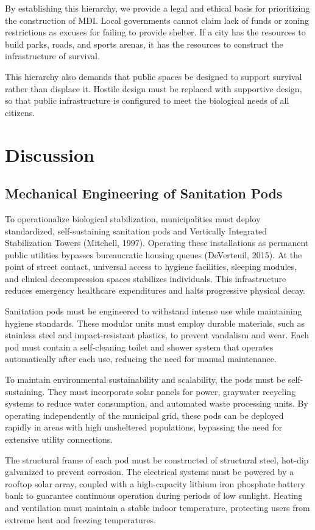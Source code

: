 \documentclass[12pt]{article}
\begin{document}
By establishing this hierarchy, we provide a legal and ethical basis for prioritizing the construction of MDI. Local governments cannot claim lack of funds or zoning restrictions as excuses for failing to provide shelter. If a city has the resources to build parks, roads, and sports arenas, it has the resources to construct the infrastructure of survival.

This hierarchy also demands that public spaces be designed to support survival rather than displace it. Hostile design must be replaced with supportive design, so that public infrastructure is configured to meet the biological needs of all citizens.

\section{Discussion}

\subsection{Mechanical Engineering of Sanitation Pods}
To operationalize biological stabilization, municipalities must deploy standardized, self-sustaining sanitation pods and Vertically Integrated Stabilization Towers (Mitchell, 1997). Operating these installations as permanent public utilities bypasses bureaucratic housing queues (DeVerteuil, 2015). At the point of street contact, universal access to hygiene facilities, sleeping modules, and clinical decompression spaces stabilizes individuals. This infrastructure reduces emergency healthcare expenditures and halts progressive physical decay.

Sanitation pods must be engineered to withstand intense use while maintaining hygiene standards. These modular units must employ durable materials, such as stainless steel and impact-resistant plastics, to prevent vandalism and wear. Each pod must contain a self-cleaning toilet and shower system that operates automatically after each use, reducing the need for manual maintenance.

To maintain environmental sustainability and scalability, the pods must be self-sustaining. They must incorporate solar panels for power, graywater recycling systems to reduce water consumption, and automated waste processing units. By operating independently of the municipal grid, these pods can be deployed rapidly in areas with high unsheltered populations, bypassing the need for extensive utility connections.

The structural frame of each pod must be constructed of structural steel, hot-dip galvanized to prevent corrosion. The electrical systems must be powered by a rooftop solar array, coupled with a high-capacity lithium iron phosphate battery bank to guarantee continuous operation during periods of low sunlight. Heating and ventilation must maintain a stable indoor temperature, protecting users from extreme heat and freezing temperatures.
\end{document}
